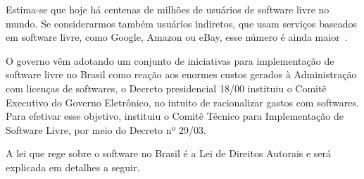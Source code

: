Estima-se que hoje há centenas de milhões de usuários de software livre no mundo. Se
considerarmos também usuários indiretos, que usam serviços baseados em software livre,
como Google, Amazon ou eBay, esse número é ainda maior~\cite{sabino2009licenccas}.



O governo vêm adotando um conjunto de iniciativas para implementação de software
livre no Brasil como reação aos enormes custos gerados à Administração com licenças
de softwares, o Decreto presidencial 18/00 instituiu o Comitê Executivo do Governo
Eletrônico, no intuito de racionalizar gastos com softwares. Para efetivar esse 
objetivo, instituiu o Comitê Técnico para Implementação de Software Livre, por
meio do Decreto nº 29/03. 

A lei que rege sobre o software no Brasil é a Lei de Direitos Autorais e será 
explicada em detalhes a seguir. 

